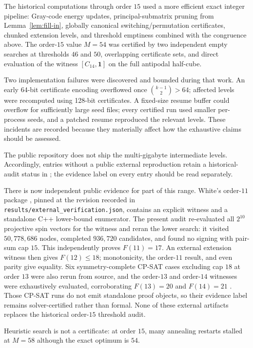 \documentclass[11pt]{article}
\theoremstyle{definition}
\theoremstyle{remark}
\begin{document}
The historical computations through order $15$ used a more efficient exact
integer pipeline: Gray-code energy updates, principal-submatrix pruning from
Lemma~\ref{lem:fill-in}, globally canonical switching/permutation
certificates, chunked extension levels, and threshold emptiness combined with
the congruence above.  The order-$15$ value $M=54$ was certified by two
independent empty searches at thresholds $46$ and $50$, overlapping
certificate sets, and direct evaluation of the witness
$[C_{14},\mathbf1]$ on the full antipodal half-cube.

Two implementation failures were discovered and bounded during that work.
An early 64-bit certificate encoding overflowed once
$\binom{k-1}{2}>64$; affected levels were recomputed using 128-bit
certificates.  A fixed-size resume buffer could overflow for sufficiently
large seed files; every certified run used smaller per-process seeds, and a
patched resume reproduced the relevant levels.  These incidents are recorded
because they materially affect how the exhaustive claims should be assessed.

The public repository does not ship the multi-gigabyte intermediate levels.
Accordingly, entries without a public external reproduction retain a
historical-audit status in ; the
evidence label on every entry should be read separately.

There is now independent public evidence for part of this range.  White's
order-$11$ package \cite{white-k11}, pinned at the revision recorded in
\texttt{results/external\_verification.json}, contains an explicit witness and
a standalone C++ lower-bound enumerator.  The present audit re-evaluated all
$2^{10}$ projective spin vectors for the witness and reran the lower search:
it visited $50{,}778{,}686$ nodes, completed $936{,}720$ candidates, and found
no signing with pair-sum cap $15$.  This independently proves $F(11)=17$.
An external extension witness then gives $F(12)\le18$; monotonicity, the
order-$11$ result, and even parity give equality.  Six symmetry-complete
CP-SAT cases excluding cap $18$ at order $13$ were also rerun from source,
and the order-$13$ and order-$14$ witnesses were exhaustively evaluated,
corroborating $F(13)=20$ and $F(14)=21$ \cite{beaumont-ledger}.  Those CP-SAT
runs do not emit standalone proof objects, so their evidence label remains
solver-certified rather than formal.  None of these external artifacts
replaces the historical order-$15$ threshold audit.

Heuristic search is not a certificate: at order $15$, many annealing restarts
stalled at $M=58$ although the exact optimum is $54$.
\end{document}
